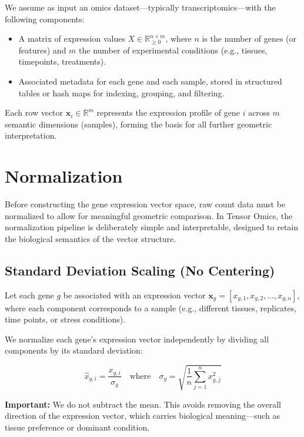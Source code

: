 \documentclass[11pt]{article}
\begin{document}
We assume as input an omics dataset—typically transcriptomics—with the following components:

\begin{itemize}[leftmargin=1.5em]
    \item A matrix of expression values $X \in \mathbb{R}_{\geq 0}^{n \times m}$, where $n$ is the number of genes (or features) and $m$ the number of experimental conditions (e.g., tissues, timepoints, treatments).
    \item Associated metadata for each gene and each sample, stored in structured tables or hash maps for indexing, grouping, and filtering.
\end{itemize}

Each row vector $\mathbf{x}_i \in \mathbb{R}^m$ represents the expression profile of gene $i$ across $m$ semantic dimensions (samples), forming the basis for all further geometric interpretation.

\section{Normalization}

Before constructing the gene expression vector space, raw count data must be normalized to allow for meaningful geometric comparison. In Tensor Omics, the normalization pipeline is deliberately simple and interpretable, designed to retain the biological semantics of the vector structure.

\subsection{Standard Deviation Scaling (No Centering)}

Let each gene \( g \) be associated with an expression vector \( \mathbf{x}_g = [x_{g,1}, x_{g,2}, \dots, x_{g,n}] \), where each component corresponds to a sample (e.g., different tissues, replicates, time points, or stress conditions).

We normalize each gene's expression vector independently by dividing all components by its standard deviation:

\[
\hat{x}_{g,i} = \frac{x_{g,i}}{\sigma_g}
\quad \text{where} \quad 
\sigma_g = \sqrt{\frac{1}{n} \sum_{j=1}^n x_{g,j}^2}
\]

\textbf{Important:} We do not subtract the mean. This avoids removing the overall direction of the expression vector, which carries biological meaning—such as tissue preference or dominant condition.
\end{document}
